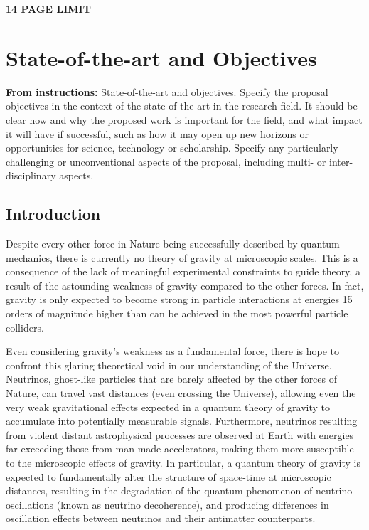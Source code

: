 \documentclass[a4paper,11pt]{article}
\newcounter{bar}
\begin{document}
\textbf{14 PAGE LIMIT}


\section{State-of-the-art and Objectives}
\vspace{0.1 cm}

\textbf{From instructions:} State-of-the-art and objectives. Specify the proposal objectives in the context of the state
of the art in the research field. It should be clear how and why the proposed work is important for
the field, and what impact it will have if successful, such as how it may open up new horizons or
opportunities for science, technology or scholarship. Specify any particularly challenging or
unconventional aspects of the proposal, including multi- or inter-disciplinary aspects.

\subsection{Introduction}

Despite every other force in Nature being successfully described by quantum mechanics, there is currently no theory of gravity at microscopic scales. This is a consequence of the lack of meaningful experimental constraints to guide theory, a result of the astounding weakness of gravity compared to the other forces. In fact, gravity is only expected to become strong in particle interactions at energies 15 orders of magnitude higher than can be achieved in the most powerful particle colliders.

Even considering gravity's weakness as a fundamental force, there is hope to confront this glaring theoretical void in our understanding of the Universe. Neutrinos, ghost-like particles that are barely affected by the other forces of Nature, can travel vast distances (even crossing the Universe), allowing even the very weak gravitational effects expected in a quantum theory of gravity to accumulate into potentially measurable signals. Furthermore, neutrinos resulting from violent distant astrophysical processes are observed at Earth with energies far exceeding those from man-made accelerators, making them more susceptible to the microscopic effects of gravity. In particular, a quantum theory of gravity is expected to fundamentally alter the structure of space-time at microscopic distances, resulting in the degradation of the quantum phenomenon of neutrino oscillations (known as neutrino decoherence), and producing differences in oscillation effects between neutrinos and their antimatter counterparts. 
\end{document}
